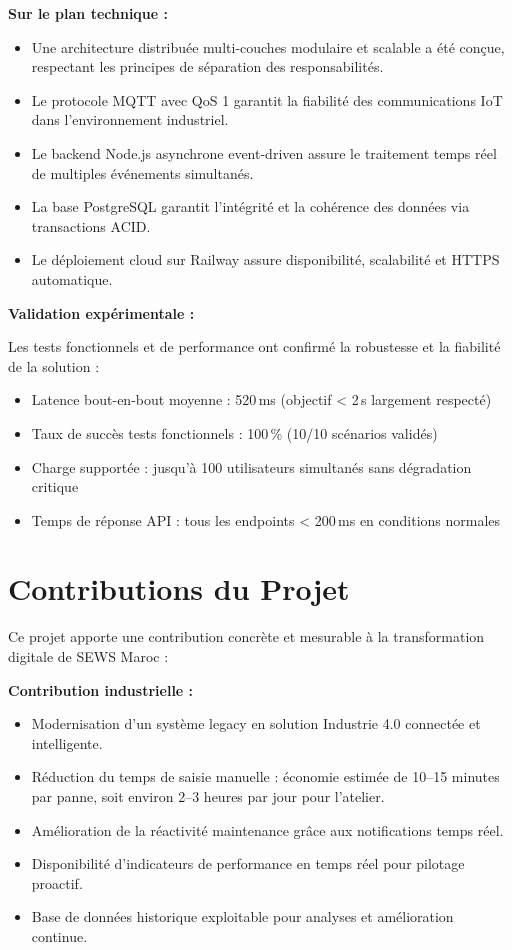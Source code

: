 \textbf{Sur le plan technique :}
\begin{itemize}
    \item Une architecture distribuée multi-couches modulaire et scalable a été conçue, respectant les principes de séparation des responsabilités.
    \item Le protocole MQTT avec QoS 1 garantit la fiabilité des communications IoT dans l'environnement industriel.
    \item Le backend Node.js asynchrone event-driven assure le traitement temps réel de multiples événements simultanés.
    \item La base PostgreSQL garantit l'intégrité et la cohérence des données via transactions ACID.
    \item Le déploiement cloud sur Railway assure disponibilité, scalabilité et HTTPS automatique.
\end{itemize}

\textbf{Validation expérimentale :}

Les tests fonctionnels et de performance ont confirmé la robustesse et la fiabilité de la solution :
\begin{itemize}
    \item Latence bout-en-bout moyenne : 520\,ms (objectif < 2\,s largement respecté)
    \item Taux de succès tests fonctionnels : 100\,\% (10/10 scénarios validés)
    \item Charge supportée : jusqu'à 100 utilisateurs simultanés sans dégradation critique
    \item Temps de réponse API : tous les endpoints < 200\,ms en conditions normales
\end{itemize}

\section*{Contributions du Projet}

Ce projet apporte une contribution concrète et mesurable à la transformation digitale de SEWS Maroc :

\textbf{Contribution industrielle :}
\begin{itemize}
    \item Modernisation d'un système legacy en solution Industrie 4.0 connectée et intelligente.
    \item Réduction du temps de saisie manuelle : économie estimée de 10--15 minutes par panne, soit environ 2--3 heures par jour pour l'atelier.
    \item Amélioration de la réactivité maintenance grâce aux notifications temps réel.
    \item Disponibilité d'indicateurs de performance en temps réel pour pilotage proactif.
    \item Base de données historique exploitable pour analyses et amélioration continue.
\end{itemize}

